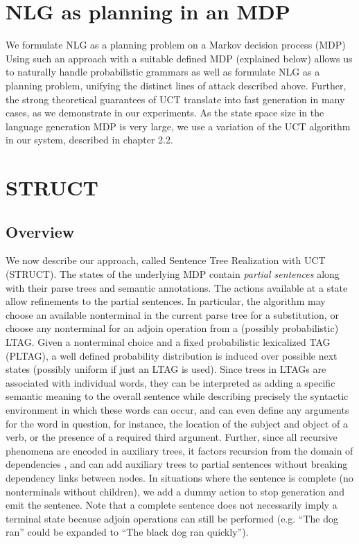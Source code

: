 \section{NLG as planning in an MDP}
We formulate NLG as a planning problem on a Markov decision process
(MDP)  Using such an approach with a suitable defined MDP
(explained below) allows us to naturally handle
probabilistic grammars as well as formulate NLG as a planning problem,
unifying the distinct lines of attack described above. Further, the
strong theoretical guarantees of UCT translate into fast generation in
many cases, as we demonstrate in our experiments.
As the state space size in the language generation MDP is
very large, we use a variation of the UCT algorithm in our system,
described in chapter 2.2.

\section{STRUCT}
\subsection{Overview}
We now describe our approach, called Sentence Tree Realization with
UCT (STRUCT). The states of the underlying MDP contain {\em partial
 sentences} along with their parse trees and semantic annotations.
The actions available at a
state allow refinements to the partial sentences. In particular, the
algorithm may choose an available nonterminal in the current parse
tree for a substitution, or choose any nonterminal for an adjoin operation from a (possibly
probabilistic) LTAG. Given a nonterminal choice and a fixed
probabilistic lexicalized TAG (PLTAG), a well defined probability
distribution is induced over possible next states (possibly uniform if
just an LTAG is used).   Since trees in LTAGs are associated
with individual words, they can be interpreted as adding a specific
semantic meaning to the overall sentence while describing precisely
the syntactic environment in which these words can occur, and can even
define any arguments for the word in question, for instance, the
location of the subject and object of a verb, or the presence of a
required third argument.  Further, since all recursive phenomena are
encoded in auxiliary trees, it factors recursion from the domain of
dependencies \cite{bauer2009statistical}, and can add auxiliary trees
to partial sentences without breaking dependency links between nodes.
In situations where the sentence is complete (no nonterminals without
children), we add a dummy action to stop generation and emit the
sentence.  Note that a complete sentence does not necessarily imply
a terminal state because adjoin operations can still be performed
(e.g. ``The dog ran'' could be expanded to ``The black dog ran quickly'').

